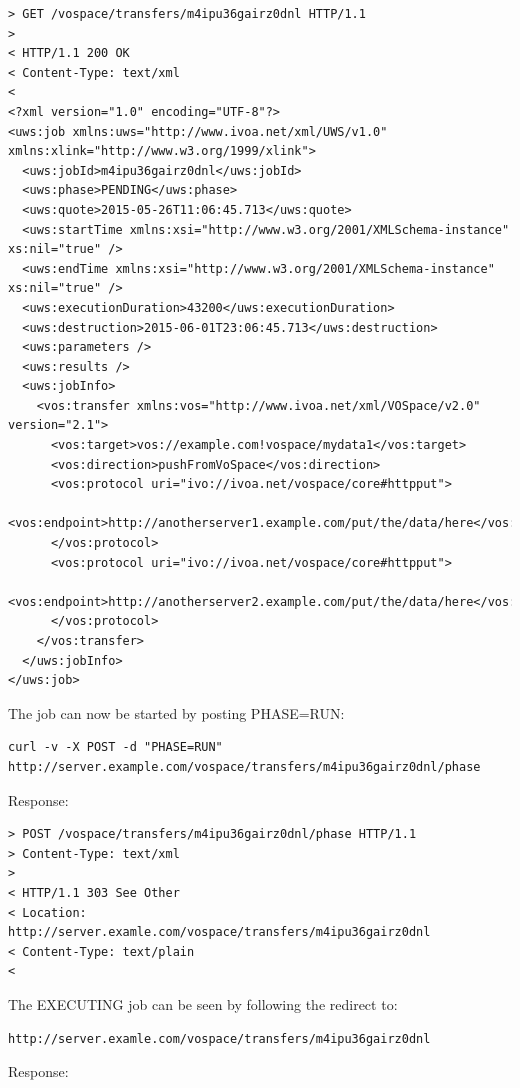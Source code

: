 \documentclass[11pt,a4paper]{ivoa}
\begin{document}
\begin{lstlisting}
> GET /vospace/transfers/m4ipu36gairz0dnl HTTP/1.1
>
< HTTP/1.1 200 OK
< Content-Type: text/xml
<
<?xml version="1.0" encoding="UTF-8"?>
<uws:job xmlns:uws="http://www.ivoa.net/xml/UWS/v1.0" xmlns:xlink="http://www.w3.org/1999/xlink">
  <uws:jobId>m4ipu36gairz0dnl</uws:jobId>
  <uws:phase>PENDING</uws:phase>
  <uws:quote>2015-05-26T11:06:45.713</uws:quote>
  <uws:startTime xmlns:xsi="http://www.w3.org/2001/XMLSchema-instance" xs:nil="true" />
  <uws:endTime xmlns:xsi="http://www.w3.org/2001/XMLSchema-instance" xs:nil="true" />
  <uws:executionDuration>43200</uws:executionDuration>
  <uws:destruction>2015-06-01T23:06:45.713</uws:destruction>
  <uws:parameters />
  <uws:results />
  <uws:jobInfo>
    <vos:transfer xmlns:vos="http://www.ivoa.net/xml/VOSpace/v2.0" version="2.1">
      <vos:target>vos://example.com!vospace/mydata1</vos:target>
      <vos:direction>pushFromVoSpace</vos:direction>
      <vos:protocol uri="ivo://ivoa.net/vospace/core#httpput">
        <vos:endpoint>http://anotherserver1.example.com/put/the/data/here</vos:endpoint>
      </vos:protocol>
      <vos:protocol uri="ivo://ivoa.net/vospace/core#httpput">
        <vos:endpoint>http://anotherserver2.example.com/put/the/data/here</vos:endpoint>
      </vos:protocol>
    </vos:transfer>
  </uws:jobInfo>
</uws:job>
\end{lstlisting}
The job can now be started by posting PHASE=RUN:
\begin{lstlisting}
curl -v -X POST -d "PHASE=RUN" http://server.example.com/vospace/transfers/m4ipu36gairz0dnl/phase
\end{lstlisting}
Response:
\begin{lstlisting}
> POST /vospace/transfers/m4ipu36gairz0dnl/phase HTTP/1.1
> Content-Type: text/xml
>
< HTTP/1.1 303 See Other
< Location: http://server.examle.com/vospace/transfers/m4ipu36gairz0dnl
< Content-Type: text/plain
<
\end{lstlisting}
The EXECUTING job can be seen by following the redirect to:
\begin{lstlisting}
http://server.examle.com/vospace/transfers/m4ipu36gairz0dnl
\end{lstlisting}
Response:
\end{document}
